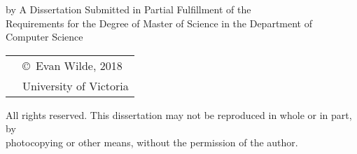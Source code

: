 \pagebreak
{
\centering
\thesistitle
\tpbreak
by
\tpbreak
\nameanddegrees
\tpbreak
A Dissertation Submitted in Partial Fulfillment of the \\
Requirements for the Degree of
\tpbreak
Master of Science
\tpbreak
in the Department of Computer Science
\vfill
\begin{tabular}{cl}
& \copyright\ Evan Wilde, 2018\\
& \phantom{\copyright} University of Victoria
\end{tabular}
\tpbreak
All rights reserved. This dissertation may not be reproduced in whole or in part, by \\
\hfill photocopying or other means, without the permission of the author.
\hfill
}
\pagebreak
